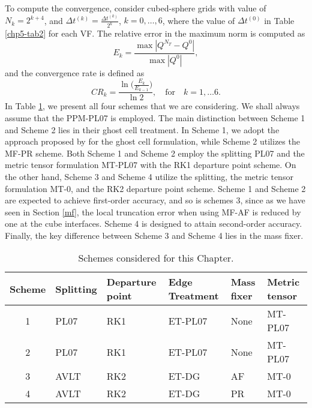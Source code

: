 To compute the convergence, consider cubed-sphere grids with value of $N_k =  2^{k+4}$,
and $\Delta t^{(k)} = \frac{\Delta t^{(k)}}{2^k}$, $k=0, \ldots, 6$, where
the value of $\Delta t^{(0)}$ in Table \ref{chp5-tab2} for each VF.
The relative error in the maximum norm is computed as
\begin{equation}
	E_k = \frac{\max |Q^{N_T} - Q^0|}{\max {|Q^0|}},
\end{equation}
and the convergence rate is defined as
\begin{equation*}
	CR_k = \frac{\ln{\bigg(\frac{E_{k}}{E_{k-1}}}\bigg)}{\ln 2}, \quad \text{for} \quad k = 1, \ldots 6.
\end{equation*}
In Table \ref{chp5-tab3}, we present all four schemes that we are considering. 
We shall always assume that the PPM-PL07 is employed. 
The main distinction between Scheme 1 and Scheme 2 lies in their ghost cell treatment.
In Scheme 1, we adopt the approach proposed by \citet{putman:2007} for the ghost cell formulation,
while Scheme 2 utilizes the MF-PR scheme.
Both Scheme 1 and Scheme 2 employ the splitting PL07 and the metric tensor formulation MT-PL07 
with the RK1 departure point scheme. On the other hand, Scheme 3 and Scheme 4 utilize the splitting,
the metric tensor formulation MT-0, and the RK2 departure point scheme.
Scheme 1 and Scheme 2 are expected to achieve first-order accuracy, and so is schemes 3, since as we have seen in Section \ref{mf},
the local truncation error when using MF-AF is reduced by one at the cube interfaces.
Scheme 4 is designed
to attain second-order accuracy. Finally, the key difference between Scheme 3 and Scheme 4 lies in the mass fixer.
\begin{table}[!ht]
	\begin{tabular}{|c|l|l|l|l|l|}
		\hline
		Scheme & Splitting & Departure point & Edge Treatment & Mass fixer & Metric tensor\\ \hline
		1   & PL07 & RK1 & ET-PL07 & None & MT-PL07\\ \hline
		2   & PL07 & RK1 & ET-PL07 & None & MT-PL07\\ \hline
		3   & AVLT & RK2 & ET-DG & AF & MT-0\\ \hline
		4   & AVLT & RK2 & ET-DG & PR & MT-0\\ \hline
	\end{tabular}
	\caption{Schemes considered for this Chapter.}
	\label{chp5-tab3} 
\end{table}
\iffalse
